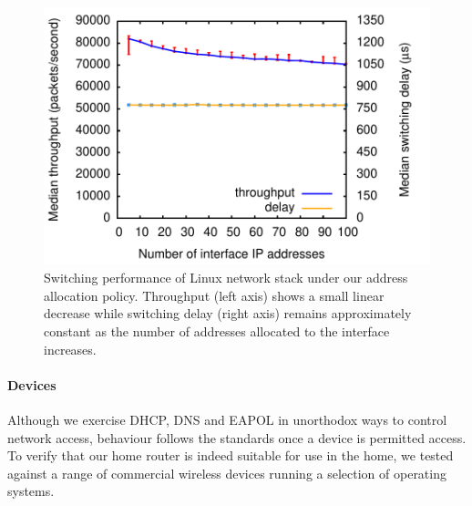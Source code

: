 \begin{figure} \centering \includegraphics[width=\columnwidth]{stack-throughput}
  \caption{\label{f:stack-throughput}Switching performance of Linux network
    stack under our address allocation policy. Throughput (left axis) shows a
    small linear decrease while switching delay (right axis) remains
    approximately constant as the number of addresses allocated to the interface
    increases.} \end{figure}

\paragraph{Devices} Although we exercise DHCP, DNS and EAPOL in unorthodox ways
to control network access, behaviour follows the standards once a device is
permitted access.  To verify that our home router is indeed suitable for use in
the home, we tested against a range of commercial wireless devices running a
selection of operating systems. 

